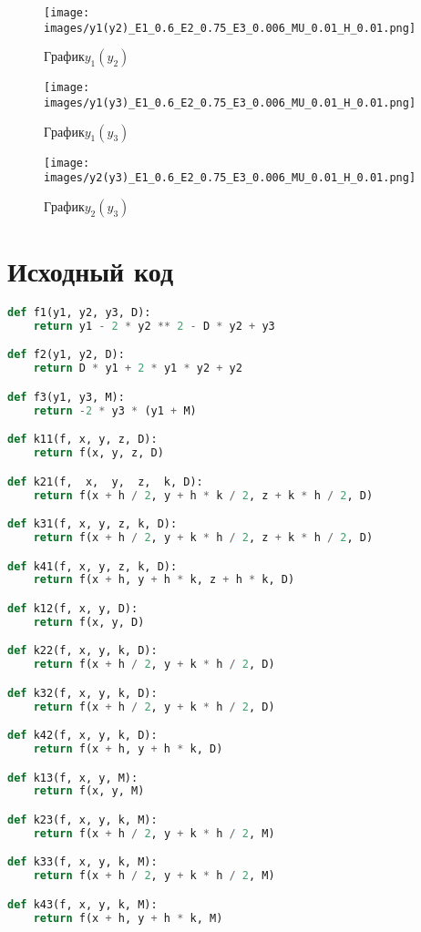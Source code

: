 \documentclass[a4paper,12pt,titlepage,finall]{article}
\begin{document}
\begin{itemize}
\begin{figure}[h]
    \centering
    \texttt{[image: images/y1(y2)\_E1\_0.6\_E2\_0.75\_E3\_0.006\_MU\_0.01\_H\_0.01.png]}
    \caption{$График y_1(y_2)$}
    \label{fig:my_label}
\end{figure}
\newpage
\begin{figure}[h]
    \centering
    \texttt{[image: images/y1(y3)\_E1\_0.6\_E2\_0.75\_E3\_0.006\_MU\_0.01\_H\_0.01.png]}
    \caption{$График y_1(y_3)$}
    \label{fig:my_label}
\end{figure}
\begin{figure}[h]
    \centering
    \texttt{[image: images/y2(y3)\_E1\_0.6\_E2\_0.75\_E3\_0.006\_MU\_0.01\_H\_0.01.png]}
    \caption{$График y_2(y_3)$}
    \label{fig:my_label}
\end{figure}
\newpage
\newpage
\section{Исходный код}
\begin{lstlisting}[language=python, caption={Исходный код программы}]
def f1(y1, y2, y3, D):
    return y1 - 2 * y2 ** 2 - D * y2 + y3

def f2(y1, y2, D):
    return D * y1 + 2 * y1 * y2 + y2

def f3(y1, y3, M):
    return -2 * y3 * (y1 + M)

def k11(f, x, y, z, D):
    return f(x, y, z, D)

def k21(f,  x,  y,  z,  k, D):
    return f(x + h / 2, y + h * k / 2, z + k * h / 2, D)

def k31(f, x, y, z, k, D):
    return f(x + h / 2, y + k * h / 2, z + k * h / 2, D)

def k41(f, x, y, z, k, D):
    return f(x + h, y + h * k, z + h * k, D)

def k12(f, x, y, D):
    return f(x, y, D)

def k22(f, x, y, k, D):
    return f(x + h / 2, y + k * h / 2, D)

def k32(f, x, y, k, D):
    return f(x + h / 2, y + k * h / 2, D)

def k42(f, x, y, k, D):
    return f(x + h, y + h * k, D)

def k13(f, x, y, M):
    return f(x, y, M)

def k23(f, x, y, k, M):
    return f(x + h / 2, y + k * h / 2, M)

def k33(f, x, y, k, M):
    return f(x + h / 2, y + k * h / 2, M)

def k43(f, x, y, k, M):
    return f(x + h, y + h * k, M)


\end{lstlisting}
\end{itemize}
\end{document}
